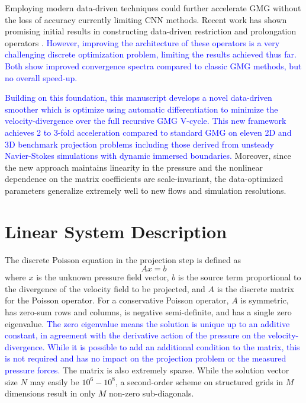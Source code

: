 \documentclass[]{elsarticle}
\begin{document}
Employing modern data-driven techniques could  further accelerate GMG without the loss of accuracy currently limiting CNN methods.  Recent work has shown promising initial results in constructing data-driven restriction and prolongation operators \cite{KATRUTSA2020112524,greenfeld2019learning}. \textcolor{blue}{However, improving the architecture of these operators is a very challenging discrete optimization problem, limiting the results achieved thus far. Both \cite{KATRUTSA2020112524,greenfeld2019learning} show improved convergence spectra compared to classic GMG methods, but no overall speed-up. }

\textcolor{blue}{Building on this foundation, this manuscript develops a novel data-driven smoother which is optimize using automatic differentiation to minimize the velocity-divergence over the full recursive GMG V-cycle. This new framework achieves 2 to 3-fold acceleration compared to standard GMG on eleven 2D and 3D benchmark projection problems including those derived from unsteady Navier-Stokes simulations with dynamic immersed boundaries.} Moreover, since the new approach maintains linearity in the pressure and the nonlinear dependence on the matrix coefficients are scale-invariant, the data-optimized parameters generalize extremely well to new flows and simulation resolutions.

\section{Linear System Description}

The discrete Poisson equation in the projection step is defined as
\begin{equation}\label{eq:axb}
    A x = b
\end{equation}
where $x$ is the unknown pressure field vector, $b$ is the source term proportional to the divergence of the velocity field to be projected, and $A$ is the discrete matrix for the Poisson operator. For a conservative Poisson operator, $A$ is symmetric, has zero-sum rows and columns, is negative semi-definite, and has a single zero eigenvalue. \textcolor{blue}{The zero eigenvalue means the solution is unique up to an additive constant, in agreement with the derivative action of the pressure on the velocity-divergence. While it is possible to add an additional condition to the matrix, this is not required and has no impact on the projection problem or the measured pressure forces.} The matrix is also extremely sparse. While the solution vector size $N$ may easily be $10^6-10^8$, a second-order scheme on structured grids in $M$ dimensions result in only $M$ non-zero sub-diagonals.
\end{document}
